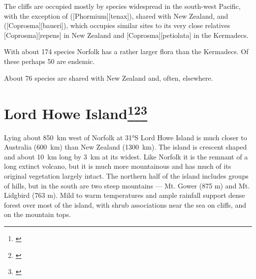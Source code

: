 The cliffs are occupied mostly by species widespread in the south-west Pacific, with the exception of  ([Phormium][tenax]), shared with New Zealand, and  ([Coprosma][baueri]), which occupies similar sites to its very close relatives [Coprosma][repens] in New Zealand and [Coprosma][petiolata] in the Kermadecs.

With about 174 species Norfolk has a rather larger flora than the Kermadecs.
Of these perhaps 50 are endemic.

About 76 species are shared with New Zealand and, often, elsewhere.

\section[Lord Howe Island]{Lord Howe Island\thinspace\footnote{\cite{oliver1896vegetation}}\footnote{\cite{green1979observations}}\footnote{\cite{hutton1986lord}}}

Lying about \SI{850}{\kilo\metre} west of Norfolk at \ang{31}S Lord Howe Island is much closer to Australia (\SI{600}{\kilo\metre}) than New Zealand (\SI{1300}{\kilo\metre}).
The island is crescent shaped and about \SI{10}{\kilo\metre} long by \SI{3}{\kilo\metre} at its widest.
Like Norfolk it is the remnant of a long extinct volcano, but it is much more mountainous and has much of its original vegetation largely intact.
The northern half of the island includes groups of hills, but in the south are two steep mountains --- Mt. Gower (875 m) and Mt. Lidgbird (763 m).
Mild to warm temperatures and ample rainfall support dense forest over most of the island, with shrub associations near the sea on cliffs, and on the mountain tops.

